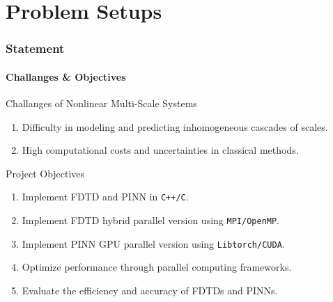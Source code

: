 \section{Problem Setups}

\begin{frame}
  \frametitle{Statement}
  \framesubtitle{Challanges \& Objectives}
  \begin{block}{Challanges of Nonlinear Multi-Scale Systems}
    \begin{enumerate}
      \item Difficulty in modeling and predicting inhomogeneous cascades of scales.
      \item High computational costs and uncertainties in classical methods.
    \end{enumerate}    
  \end{block}

  \begin{block}{Project Objectives}
    \begin{enumerate}
      \item Implement FDTD and PINN in \texttt{C++/C}.
      \item Implement FDTD hybrid parallel version using \texttt{MPI/OpenMP}.
      \item Implement PINN GPU parallel version using \texttt{Libtorch/CUDA}.
      \item Optimize performance through parallel computing frameworks.
      \item Evaluate the efficiency and accuracy of FDTDs and PINNs.
    \end{enumerate}
  \end{block}
\end{frame}


